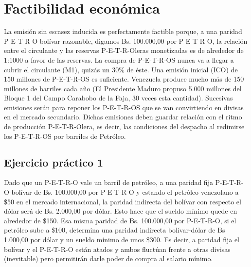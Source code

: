 %
\section{Factibilidad económica}
\label{sec:fact}
%
La emisión sin escasez inducida es perfectamente factible porque, a una paridad P-E-T-R-O-bolívar razonable, digamos Bs. 100.000,00 por P-E-T-R-O, la relación entre el circulante y las reservas P-E-T-R-Oleras monetizadas es de alrededor de 1:1000 a favor de las reservas. La compra de P-E-T-R-OS nunca va a llegar a cubrir el circulante (M1), quizás un 30\% de éste. Una emisión inicial (ICO) de 150 millones de P-E-T-R-OS es suficiente. Venezuela produce mucho más de 150 millones de barriles cada año (El Presidente Maduro propuso 5.000 millones del Bloque 1 del Campo Carabobo de la Faja, 30 veces esta cantidad). Sucesivas emisiones serán para reponer los P-E-T-R-OS que se van convirtiendo en divisas en el mercado secundario. Dichas emisiones deben guardar relación con el ritmo de producción P-E-T-R-Olera, es decir, las condiciones del despacho al redimirse los P-E-T-R-OS por barriles de Petróleo.
%
\subsection{Ejercicio práctico 1}
%
Dado que un P-E-T-R-O vale un barril de petróleo, a una paridad fija P-E-T-R-O-bolívar de Bs. 100.000,00 por P-E-T-R-O y estando el petróleo venezolano a \$50 en el mercado internacional, la paridad indirecta del bolívar con respecto el dólar será de Bs. 2.000,00 por dólar. Esto hace que el sueldo mínimo quede en alrededor de \$150. Esa misma paridad de Bs. 100.000,00 por P-E-T-R-O, si el petróleo sube a \$100, determina una paridad indirecta bolívar-dólar de Bs 1.000,00 por dólar y un sueldo mínimo de unos \$300. Es decir, a paridad fija el bolívar y el P-E-T-R-O están atados y ambos fluctúan frente a otras divisas (inevitable) pero permitirán darle poder de compra al salario mínimo.
